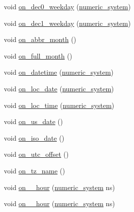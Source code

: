 \begin{DoxyCompactItemize}
void \hyperlink{structinternal_1_1chrono__formatter_a904e5619c38a0f3b993092602c243de2}{on\+\_\+dec0\+\_\+weekday} (\hyperlink{namespaceinternal_a16e2a1195ca0f5beab658685f71df86b}{numeric\+\_\+system})
\item 
void \hyperlink{structinternal_1_1chrono__formatter_aa61ad8285193d7b67f3d7c3130fcd668}{on\+\_\+dec1\+\_\+weekday} (\hyperlink{namespaceinternal_a16e2a1195ca0f5beab658685f71df86b}{numeric\+\_\+system})
\item 
void \hyperlink{structinternal_1_1chrono__formatter_a10d11ac67861dc43c271099981cba98d}{on\+\_\+abbr\+\_\+month} ()
\item 
void \hyperlink{structinternal_1_1chrono__formatter_a37539cac3a3f1241481e146a20780713}{on\+\_\+full\+\_\+month} ()
\item 
void \hyperlink{structinternal_1_1chrono__formatter_ad1ce1f229948a67141aa320f185f9bf3}{on\+\_\+datetime} (\hyperlink{namespaceinternal_a16e2a1195ca0f5beab658685f71df86b}{numeric\+\_\+system})
\item 
void \hyperlink{structinternal_1_1chrono__formatter_adf05c0b171fec8af06faf4868bb4fbf0}{on\+\_\+loc\+\_\+date} (\hyperlink{namespaceinternal_a16e2a1195ca0f5beab658685f71df86b}{numeric\+\_\+system})
\item 
void \hyperlink{structinternal_1_1chrono__formatter_a1228ee5fbece50b8b0cc103b2c8af230}{on\+\_\+loc\+\_\+time} (\hyperlink{namespaceinternal_a16e2a1195ca0f5beab658685f71df86b}{numeric\+\_\+system})
\item 
void \hyperlink{structinternal_1_1chrono__formatter_a831055cd8da4eecca5d501d8b14722b1}{on\+\_\+us\+\_\+date} ()
\item 
void \hyperlink{structinternal_1_1chrono__formatter_ab7067476c026fa0fffedbd6aa7088713}{on\+\_\+iso\+\_\+date} ()
\item 
void \hyperlink{structinternal_1_1chrono__formatter_a3f36832d4407ff9d035d57ab5904bd83}{on\+\_\+utc\+\_\+offset} ()
\item 
void \hyperlink{structinternal_1_1chrono__formatter_a910fce1f44ec83ca85ff6cb5ebbb3771}{on\+\_\+tz\+\_\+name} ()
\item 
void \hyperlink{structinternal_1_1chrono__formatter_a7aca4b4319e557806c9461efd2c4eaf4}{on\+\_\+\_\+hour} (\hyperlink{namespaceinternal_a16e2a1195ca0f5beab658685f71df86b}{numeric\+\_\+system} ns)
\item 
void \hyperlink{structinternal_1_1chrono__formatter_a6b6521428a41d5f6db9c54f6afd993e2}{on\+\_\+\_\+hour} (\hyperlink{namespaceinternal_a16e2a1195ca0f5beab658685f71df86b}{numeric\+\_\+system} ns)

\end{DoxyCompactItemize}
